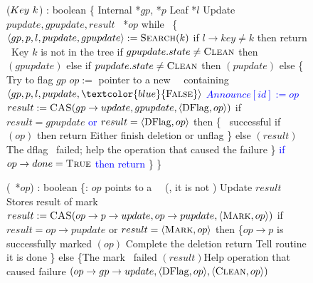 \begin{figure*}
	\scriptsize
	\begin{code}
		\firstline
		($Key\ k$) : boolean \{\nlc
		\n Internal *$gp$, *$p$\nlc
		Leaf *$l$\nlc
		Update $pupdate, gpupdate, result$\nlc
		\DFlag\ *$op$\bl\nlc
		while \TRUE\ \{ \nlc
		\n     $\langle gp, p, l, pupdate, gpupdate \rangle := \mbox{\sc Search}(k)$\label{del-search}\nlc
		if $l\rightarrow key \neq k$ then return \FALSE\ \tabtabcom Key $k$ is not in the tree\label{delete-false}\nlc
		if $gpupdate.state \neq \mbox{\sc Clean}$ then $(gpupdate)$ \label{del-help-unclean-1}\nlc
		else if $pupdate.state \neq \mbox{\sc Clean}$ then $(pupdate)$\label{del-help-unclean-2}\nlc
		else \{ \tabtabcom Try to flag $gp$\nlc
		\n          $op :=$ pointer to a new \DFlag\ \record\  containing $\langle gp, p, l, pupdate, \textcolor{blue}{\FALSE} \rangle$\label{new-DFlag}\nlc
		\textcolor{blue}{$Announce[id] := op$} \nlc
		$result := \mbox{\sc CAS}(gp\rightarrow update, gpupdate, \langle \mbox{DFlag}, op \rangle)$ \label{dflag-cas}\nlc
		if $result = gpupdate$ \textcolor{blue}{ or $result = \langle \mbox{DFlag}, op \rangle$} then \{ \tabtabcom \CASB\ successful \nlc
		\n             if $(op)$ then return \TRUE \label{delete-true} \tabtabcom Either finish deletion or unflag\nlc
		\p          \}\nlc                 
		else $(result)$ \tabcom The dflag \CASB\ failed; help the operation that caused the failure \label{del-help-after-failure}\nlc%
		\p     \}\nlc
		\textcolor{blue}{if $op \rightarrow done = \mbox{\sc True}$ then} \nlc
		\n		\textcolor{blue}{return \TRUE} \nlc \p
		\p \}\nlc
		\p
		\}\bl
		\nlc
		
		(\DFlag\ *$op$) : boolean \{\ul
		\n   {}:  $op$ points to a \DFlag\ \record\  (\ie, it is not \NULL)\nlc%
		Update $result$ \tabtabcom Stores result of mark \CASB\bl\nlc
		$result := \mbox{\sc CAS}(op\rightarrow p\rightarrow update, op\rightarrow pupdate, \langle \mbox{\sc Mark}, op\rangle)$ \label{mark-cas}\nlc     
		if $result = op\rightarrow pupdate$ or $result = \langle \mbox{\sc Mark}, op\rangle$ then \label{checkmark}\{\tabtabcom $op\rightarrow p$ is successfully marked\nlc
		\n          {}$(op)$ \label{call-hm1} \tabtabcom Complete the deletion\nlc
		return \TRUE\tabtabcom Tell  routine it is done\nlc
		\p       \}\nlc
		else \{\tabtabcom The mark \CASB\ failed \nlc
		\n              
		$(result)$\label{help-after-failed-mark}\tabtabcom Help operation that caused failure\nlc
		\CASB$(op\rightarrow gp\rightarrow update, \langle \mbox{DFlag}, op\rangle, \langle \mbox{\sc Clean}, op\rangle)$ \label{backtrack-cas}\nlc
		

\end{code}
\end{figure*}
